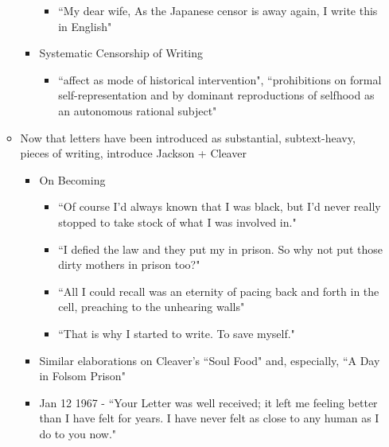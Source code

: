\documentclass[14pt, letterpaper]{report}
\begin{document}
\begin{enumerate}
\begin{itemize}
\begin{itemize}
\begin{itemize}
					\item ``My dear wife, As the Japanese censor is away again, I write this in 
						English"\autocite[121]{life-of-paper}
					
				\end{itemize}
				
				\item Systematic Censorship of Writing
				\begin{itemize}

					\item ``affect as mode of historical intervention", 
					``prohibitions on formal self-representation and by 
					dominant reproductions of selfhood as an autonomous 
					rational subject"\autocite[121]{life-of-paper}

				
				\end{itemize}
				
			\end{itemize}

			\item   Now that letters have been introduced as substantial, subtext-heavy, 
			        pieces of writing, introduce Jackson + Cleaver
				\begin{itemize}
				
					\item On Becoming
					\begin{itemize}
						\item ``Of course I'd always known that I was black, but I'd
							never really stopped to take stock of what I was involved 
							in."\autocite[3]{soul-on-ice}
						\item ``I defied the law and they put my in prison. So why not put
							those dirty mothers in prison too?"\autocite[4]{soul-on-ice}
						\item ``All I could recall was an eternity of pacing back and forth in
							the cell, preaching to the unhearing walls"\autocite[11]{soul-on-ice}
						\item ``That is why I started to write. To save myself."\autocite[15]{soul-on-ice}
					\end{itemize}
					
					\item Similar elaborations on Cleaver's ``Soul Food" and, especially, ``A Day in Folsom Prison"

					\item   Jan 12 1967 - ``Your Letter was well received; it left me feeling better 
						than I have felt for years. I have never felt as close to any human as I 
						do to you now."\autocite[99]{soledad-brother}


\end{itemize}
\end{itemize}
\end{enumerate}
\end{document}
